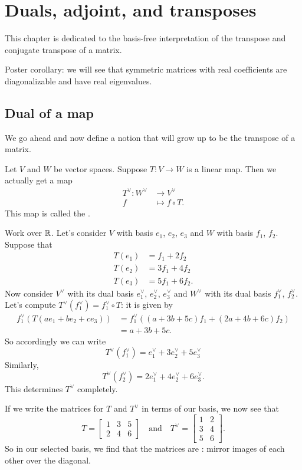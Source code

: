 \chapter{Duals, adjoint, and transposes}
This chapter is dedicated to the basis-free interpretation
of the transpose and conjugate transpose of a matrix.

Poster corollary: we will see that
symmetric matrices with real coefficients
are diagonalizable and have real eigenvalues.

\section{Dual of a map}
We go ahead and now define a notion
that will grow up to be the transpose of a matrix.

\begin{definition}
	Let $V$ and $W$ be vector spaces.
	Suppose $T \colon V \to W$ is a linear map.
	Then we actually get a map
	\begin{align*}
		T^\vee \colon W^\vee &\to V^\vee \\
		f &\mapsto f \circ T.
	\end{align*}
	This map is called the .
\end{definition}

\begin{example}
	Work over $\mathbb R$.
	Let's consider $V$ with basis $e_1$, $e_2$, $e_3$
	and $W$ with basis $f_1$, $f_2$.
	Suppose that
	\begin{align*}
		T(e_1) &= f_1 + 2f_2 \\
		T(e_2) &= 3f_1 + 4f_2 \\
		T(e_3) &= 5f_1 + 6f_2.
	\end{align*}
	Now consider $V^\vee$ with its dual basis $e_1^\vee$,
	$e_2^\vee$, $e_3^\vee$
	and $W^\vee$ with its dual basis $f_1^\vee$, $f_2^\vee$.
	Let's compute $T^\vee(f_1^\vee) = f_1^\vee \circ T$:
	it is given by
	\begin{align*}
		f_1^\vee \left( T(ae_1 + be_2 + ce_3) \right)
		&= f_1^\vee\left( (a+3b+5c) f_1 + (2a+4b+6c) f_2 \right) \\
		&= a + 3b + 5c.
	\end{align*}
	So accordingly we can write
	\[ T^\vee(f_1^\vee) = e_1^\vee + 3e_2^\vee + 5e_3^\vee \]
	Similarly,
	\[ T^\vee(f_2^\vee) = 2e_1^\vee + 4e_2^\vee + 6e_3^\vee. \]
	This determines $T^\vee$ completely.
\end{example}
If we write the matrices for $T$ and $T^\vee$ in terms of our basis,
we now see that
\[ T = \begin{bmatrix}
		1 & 3 & 5 \\
		2 & 4 & 6
	\end{bmatrix}
	\quad\text{and}\quad
	T^\vee = \begin{bmatrix}
		1 & 2 \\
		3 & 4 \\
		5 & 6
	\end{bmatrix}.
\]
So in our selected basis,
we find that the matrices are :
mirror images of each other over the diagonal.


